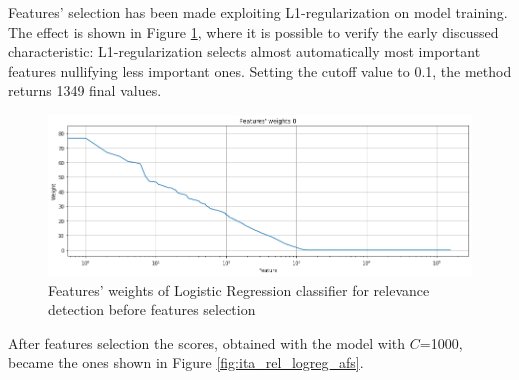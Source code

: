 
Features' selection has been made exploiting L1-regularization on model training. The effect is shown in Figure \ref{fig:ita_rel_logreg_fs}, where it is possible to verify the early discussed characteristic: L1-regularization selects almost automatically most important features nullifying less important ones. Setting the cutoff value to 0.1, the method returns 1349 final values.\\

\begin{figure}[H]
	\centering
	\includegraphics[width=\textwidth]{figures/conf_matrices/ita_rel_logreg/ita_rel_logreg_fs.png}
	\caption{Features' weights of Logistic Regression classifier for relevance detection before features selection}
	\label{fig:ita_rel_logreg_fs}
\end{figure}

After features selection the scores, obtained with the model with $C$=1000, became the ones shown in Figure \ref{fig:ita_rel_logreg_afs}.


